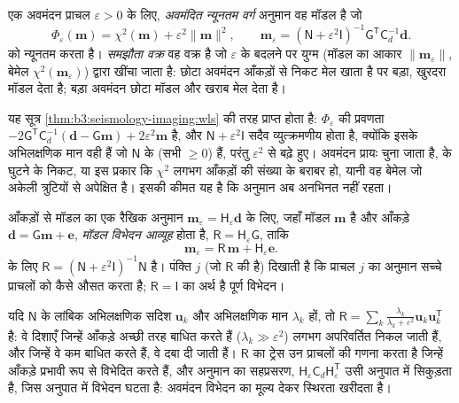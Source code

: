 \begin{definition}\label{def:b3:seismology-imaging:damped}
एक अवमंदन प्राचल $\varepsilon > 0$ के लिए, \emph{अवमंदित न्यूनतम
वर्ग} अनुमान वह मॉडल है जो
\[
  \Phi_\varepsilon(\mathbf m) = \chi^2(\mathbf m) + \varepsilon^2\|\mathbf m\|^2 ,
  \qquad
  \mathbf m_\varepsilon = \left(\mathsf N + \varepsilon^2\mathsf I\right)^{-1}
  \mathsf G^{\mathsf T}\mathsf C_d^{-1}\mathbf d .
\]
को न्यूनतम करता है। \emph{समझौता वक्र} वह वक्र है जो
$\varepsilon$ के बदलने पर युग्म (मॉडल का आकार $\|\mathbf m_\varepsilon\|$,
बेमेल $\chi^2(\mathbf m_\varepsilon)$) द्वारा खींचा जाता है: छोटा अवमंदन आँकड़ों से निकट मेल खाता है
पर बड़ा, खुरदरा मॉडल देता है; बड़ा अवमंदन छोटा मॉडल और खराब मेल देता है।
\end{definition}

यह सूत्र \cref{thm:b3:seismology-imaging:wls} की तरह प्राप्त होता है: $\Phi_\varepsilon$ की प्रवणता
$-2\mathsf G^{\mathsf T}\mathsf C_d^{-1}(\mathbf d -
\mathsf G\mathbf m) + 2\varepsilon^2\mathbf m$ है, और $\mathsf N + \varepsilon^2
\mathsf I$ सदैव व्युत्क्रमणीय होता है, क्योंकि इसके अभिलक्षणिक मान वही हैं जो
$\mathsf N$ के (सभी $\ge 0$) हैं, परंतु $\varepsilon^2$ से बढ़े हुए। अवमंदन प्रायः
चुना जाता है,  के घुटने के निकट, या इस प्रकार कि $\chi^2$ लगभग
आँकड़ों की संख्या के बराबर हो, यानी वह बेमेल जो अकेली त्रुटियों से अपेक्षित है। इसकी कीमत यह है कि
अनुमान अब अनभिनत नहीं रहता।

\begin{definition}[मॉडल विभेदन आव्यूह]\label{def:b3:seismology-imaging:resolution}
आँकड़ों से मॉडल का एक रैखिक अनुमान $\mathbf m_\varepsilon = \mathsf H_\varepsilon \mathbf d$
के लिए, जहाँ मॉडल $\mathbf m$ है और आँकड़े $\mathbf d = \mathsf G\mathbf m + \mathbf e$,
\emph{मॉडल विभेदन आव्यूह} होता है,
$\mathsf R = \mathsf H_\varepsilon\mathsf G$, ताकि
\[
  \mathbf m_\varepsilon = \mathsf R\,\mathbf m + \mathsf H_\varepsilon\mathbf e .
\]
 के लिए $\mathsf R = (\mathsf N + \varepsilon^2\mathsf I)^{-1}
\mathsf N$ है। पंक्ति $j$ (जो $\mathsf R$ की है) दिखाती है कि प्राचल $j$ का अनुमान
सच्चे प्राचलों को कैसे औसत करता है; $\mathsf R = \mathsf I$ का अर्थ है पूर्ण विभेदन।
\end{definition}

यदि $\mathsf N$ के लांबिक अभिलक्षणिक सदिश $\mathbf u_k$ और अभिलक्षणिक मान
$\lambda_k$ हों, तो $\mathsf R = \sum_k \frac{\lambda_k}{\lambda_k + \varepsilon^2}
\mathbf u_k\mathbf u_k^{\mathsf T}$ है: वे दिशाएँ जिन्हें आँकड़े अच्छी तरह बाधित करते हैं
($\lambda_k \gg \varepsilon^2$) लगभग अपरिवर्तित निकल जाती हैं, और जिन्हें वे कम बाधित करते हैं,
वे दबा दी जाती हैं। $\mathsf R$ का ट्रेस उन प्राचलों की गणना करता है जिन्हें आँकड़े
प्रभावी रूप से विभेदित करते हैं, और अनुमान का सहप्रसरण,
$\mathsf H_\varepsilon\mathsf C_d\mathsf H_\varepsilon^{\mathsf T}$ उसी अनुपात में सिकुड़ता है,
जिस अनुपात में विभेदन घटता है: अवमंदन विभेदन का मूल्य देकर स्थिरता खरीदता है।

